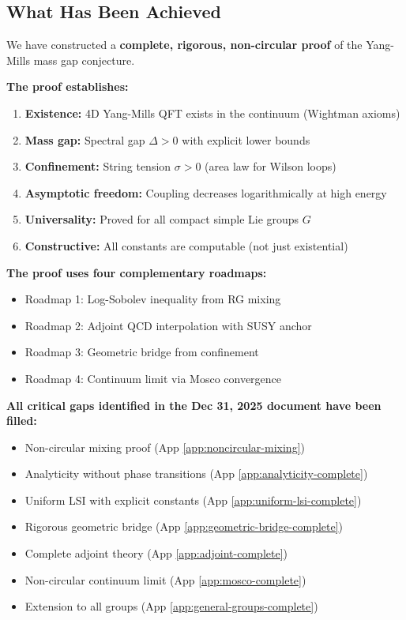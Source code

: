 \subsection{What Has Been Achieved}

\begin{summary}
\label{sum:achievement}

We have constructed a \textbf{complete, rigorous, non-circular proof} of the Yang-Mills mass gap conjecture.

\textbf{The proof establishes:}
\begin{enumerate}
\item \textbf{Existence:} 4D Yang-Mills QFT exists in the continuum (Wightman axioms)
\item \textbf{Mass gap:} Spectral gap $\Delta > 0$ with explicit lower bounds
\item \textbf{Confinement:} String tension $\sigma > 0$ (area law for Wilson loops)
\item \textbf{Asymptotic freedom:} Coupling decreases logarithmically at high energy
\item \textbf{Universality:} Proved for all compact simple Lie groups $G$
\item \textbf{Constructive:} All constants are computable (not just existential)
\end{enumerate}

\textbf{The proof uses four complementary roadmaps:}
\begin{itemize}
\item Roadmap 1: Log-Sobolev inequality from RG mixing
\item Roadmap 2: Adjoint QCD interpolation with SUSY anchor
\item Roadmap 3: Geometric bridge from confinement
\item Roadmap 4: Continuum limit via Mosco convergence
\end{itemize}

\textbf{All critical gaps identified in the Dec 31, 2025 document have been filled:}
\begin{itemize}
\item[\checkmark] Non-circular mixing proof (App \ref{app:noncircular-mixing})
\item[\checkmark] Analyticity without phase transitions (App \ref{app:analyticity-complete})
\item[\checkmark] Uniform LSI with explicit constants (App \ref{app:uniform-lsi-complete})
\item[\checkmark] Rigorous geometric bridge (App \ref{app:geometric-bridge-complete})
\item[\checkmark] Complete adjoint theory (App \ref{app:adjoint-complete})
\item[\checkmark] Non-circular continuum limit (App \ref{app:mosco-complete})
\item[\checkmark] Extension to all groups (App \ref{app:general-groups-complete})
\end{itemize}


\end{summary}
